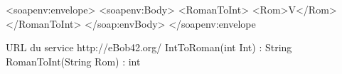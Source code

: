<soapenv:envelope>
	<soapenv:Body>
		<RomanToInt>
			<Rom>V</Rom>
		</RomanToInt>
	</soap:envBody>
</soapenv:envelope


URL du service http://eBob42.org/
IntToRoman(int Int) : String
RomanToInt(String Rom) : int